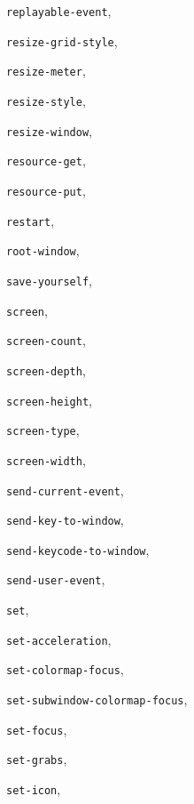\begin{theindex}
\item {\tt replayable-event}, {\bf\pageref{replayable-event}}
\item {\tt resize-grid-style}, {\bf\pageref{resize-grid-style}}
\item {\tt resize-meter}, {\bf\pageref{resize-meter}}
\item {\tt resize-style}, {\bf\pageref{resize-style}}
\item {\tt resize-window}, {\bf\pageref{resize-window}}
\item {\tt resource-get}, {\bf\pageref{resource-get}}
\item {\tt resource-put}, {\bf\pageref{resource-put}}
\item {\tt restart}, {\bf\pageref{restart}}
\item {\tt root-window}, {\bf\pageref{root-window}}
\item {\tt save-yourself}, {\bf\pageref{save-yourself}}
\item {\tt screen}, {\bf\pageref{screen}}
\item {\tt screen-count}, {\bf\pageref{screen-count}}
\item {\tt screen-depth}, {\bf\pageref{screen-depth}}
\item {\tt screen-height}, {\bf\pageref{screen-height}}
\item {\tt screen-type}, {\bf\pageref{screen-type}}
\item {\tt screen-width}, {\bf\pageref{screen-width}}
\item {\tt send-current-event}, {\bf\pageref{send-current-event}}
\item {\tt send-key-to-window}, {\bf\pageref{send-key-to-window}}
\item {\tt send-keycode-to-window}, {\bf\pageref{send-keycode-to-window}}
\item {\tt send-user-event}, {\bf\pageref{send-user-event}}
\item {\tt set}, {\bf\pageref{set}}
\item {\tt set-acceleration}, {\bf\pageref{set-acceleration}}
\item {\tt set-colormap-focus}, {\bf\pageref{set-colormap-focus}}
\item {\tt set-subwindow-colormap-focus}, {\bf\pageref{set-subwindow-colormap-focus}}
\item {\tt set-focus}, {\bf\pageref{set-focus}}
\item {\tt set-grabs}, {\bf\pageref{set-grabs}}
\item {\tt set-icon}, {\bf\pageref{set-icon}}

\end{theindex}
